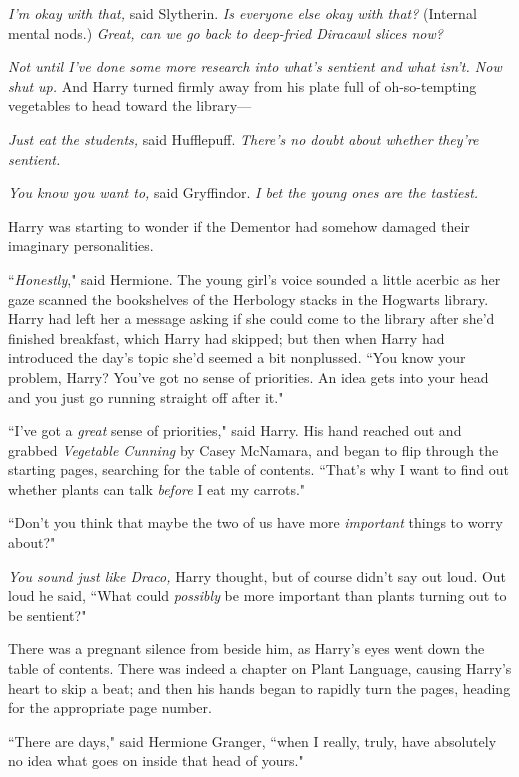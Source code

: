 \emph{I'm okay with that,} said Slytherin. \emph{Is everyone else okay with that?} (Internal mental nods.) \emph{Great, can we go back to deep-fried Diracawl slices now?}

\emph{Not until I've done some more research into what's sentient and what isn't. Now shut up.} And Harry turned firmly away from his plate full of oh-so-tempting vegetables to head toward the library—

\emph{Just eat the students,} said Hufflepuff. \emph{There's no doubt about whether \emph{they're} sentient.}

\emph{You know you want to,} said Gryffindor. \emph{I bet the young ones are the tastiest.}

Harry was starting to wonder if the Dementor had somehow damaged their imaginary personalities.

\later

``\emph{Honestly}," said Hermione. The young girl's voice sounded a little acerbic as her gaze scanned the bookshelves of the Herbology stacks in the Hogwarts library. Harry had left her a message asking if she could come to the library after she'd finished breakfast, which Harry had skipped; but then when Harry had introduced the day's topic she'd seemed a bit nonplussed. ``You know your problem, Harry? You've got no sense of priorities. An idea gets into your head and you just go running straight off after it."

``I've got a \emph{great} sense of priorities," said Harry. His hand reached out and grabbed \emph{Vegetable Cunning} by Casey McNamara, and began to flip through the starting pages, searching for the table of contents. ``That's why I want to find out whether plants can talk \emph{before} I eat my carrots."

``Don't you think that maybe the two of us have more \emph{important} things to worry about?"

\emph{You sound just like Draco,} Harry thought, but of course didn't say out loud. Out loud he said, ``What could \emph{possibly} be more important than plants turning out to be sentient?"

There was a pregnant silence from beside him, as Harry's eyes went down the table of contents. There was indeed a chapter on Plant Language, causing Harry's heart to skip a beat; and then his hands began to rapidly turn the pages, heading for the appropriate page number.

``There are days," said Hermione Granger, ``when I really, truly, have absolutely no idea what goes on inside that head of yours."

